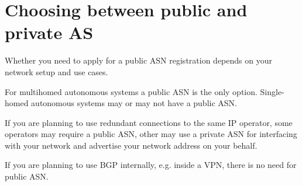 \section{Choosing between public and private AS}

Whether you need to apply for a public ASN registration depends on your network setup and use cases.

For multihomed autonomous systems a public ASN is the only option. Single-homed autonomous systems may or may not
have a public ASN.

If you are planning to use redundant connections to the same IP operator, some operators may require a public ASN,
other may use a private ASN for interfacing with your network and advertise your network address on your behalf.

If you are planning to use BGP internally, e.g. inside a VPN, there is no need for public ASN.

